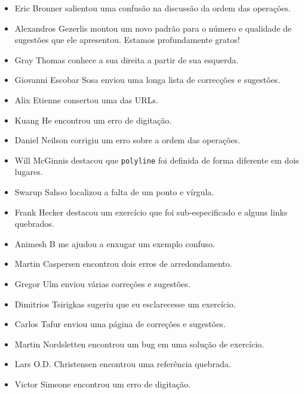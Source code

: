 \documentclass[10pt]{book}
\begin{document}
\begin {itemize}
\item Eric Bronner salientou uma confusão na discussão da
ordem das operações.

\item Alexandros Gezerlis montou um novo padrão para o número e
qualidade de sugestões que ele apresentou. Estamos profundamente gratos!

\item Gray Thomas conhece a sua direita a partir de sua esquerda.

\item Giovanni Escobar Sosa enviou uma longa lista de correcções e
sugestões.

\item Alix Etienne consertou uma das URLs.

\item Kuang He encontrou um erro de digitação.

\item Daniel Neilson corrigiu um erro sobre a ordem das operações.

\item Will McGinnis destacou que {\tt polyline} foi definida
de forma diferente em dois lugares.

\item Swarup Sahoo localizou a falta de um ponto e vírgula.

\item Frank Hecker destacou um exercício que foi sub-especificado e
alguns links quebrados.

\item Animesh B me ajudou a enxugar um exemplo confuso.

\item Martin Caspersen encontrou dois erros de arredondamento.

\item Gregor Ulm enviou várias correções e sugestões.

\item Dimitrios Tsirigkas sugeriu que eu esclarecesse um exercício.

\item Carlos Tafur enviou uma página de correções e sugestões.

\item Martin Nordsletten encontrou um bug em uma solução de exercício.

\item Lars O.D. Christensen encontrou uma referência quebrada.

\item Victor Simeone encontrou um erro de digitação.


\end{itemize}
\end{document}
